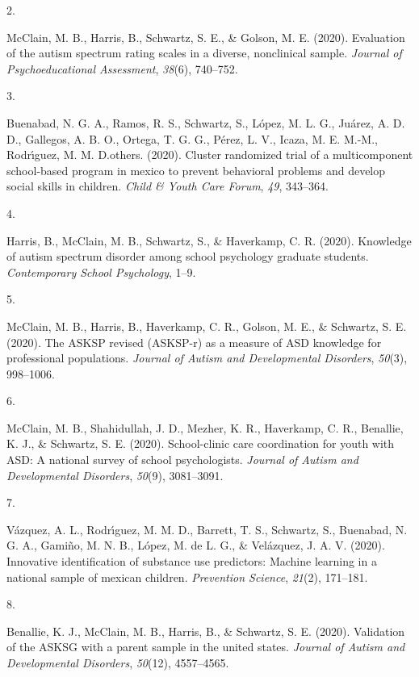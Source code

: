 \documentclass[11pt,a4paper,]{moderncv}
\newlength{\csllabelwidth}
\newcommand{\CSLLeftMargin}[1]{\parbox[t]{\csllabelwidth}{#1}}
\newcommand{\CSLRightInline}[1]{\parbox[t]{\linewidth - \csllabelwidth}{#1}}
\begin{document}
\leavevmode{}%
\CSLLeftMargin{2. }
\CSLRightInline{McClain, M. B., Harris, B., Schwartz, S. E., \& Golson,
M. E. (2020). Evaluation of the autism spectrum rating scales in a
diverse, nonclinical sample. \emph{Journal of Psychoeducational
Assessment}, \emph{38}(6), 740--752.}

\leavevmode{}%
\CSLLeftMargin{3. }
\CSLRightInline{Buenabad, N. G. A., Ramos, R. S., Schwartz, S., López,
M. L. G., Juárez, A. D. D., Gallegos, A. B. O., Ortega, T. G. G., Pérez,
L. V., Icaza, M. E. M.-M., Rodrı́guez, M. M. D.others. (2020). Cluster
randomized trial of a multicomponent school-based program in mexico to
prevent behavioral problems and develop social skills in children.
\emph{Child \& Youth Care Forum}, \emph{49}, 343--364.}

\leavevmode{}%
\CSLLeftMargin{4. }
\CSLRightInline{Harris, B., McClain, M. B., Schwartz, S., \& Haverkamp,
C. R. (2020). Knowledge of autism spectrum disorder among school
psychology graduate students. \emph{Contemporary School Psychology},
1--9.}

\leavevmode{}%
\CSLLeftMargin{5. }
\CSLRightInline{McClain, M. B., Harris, B., Haverkamp, C. R., Golson, M.
E., \& Schwartz, S. E. (2020). The ASKSP revised (ASKSP-r) as a measure
of ASD knowledge for professional populations. \emph{Journal of Autism
and Developmental Disorders}, \emph{50}(3), 998--1006.}

\leavevmode{}%
\CSLLeftMargin{6. }
\CSLRightInline{McClain, M. B., Shahidullah, J. D., Mezher, K. R.,
Haverkamp, C. R., Benallie, K. J., \& Schwartz, S. E. (2020).
School-clinic care coordination for youth with ASD: A national survey of
school psychologists. \emph{Journal of Autism and Developmental
Disorders}, \emph{50}(9), 3081--3091.}

\leavevmode{}%
\CSLLeftMargin{7. }
\CSLRightInline{Vázquez, A. L., Rodrı́guez, M. M. D., Barrett, T. S.,
Schwartz, S., Buenabad, N. G. A., Gamiño, M. N. B., López, M. de L. G.,
\& Velázquez, J. A. V. (2020). Innovative identification of substance
use predictors: Machine learning in a national sample of mexican
children. \emph{Prevention Science}, \emph{21}(2), 171--181.}

\leavevmode{}%
\CSLLeftMargin{8. }
\CSLRightInline{Benallie, K. J., McClain, M. B., Harris, B., \&
Schwartz, S. E. (2020). Validation of the ASKSG with a parent sample in
the united states. \emph{Journal of Autism and Developmental Disorders},
\emph{50}(12), 4557--4565.}
\end{document}
